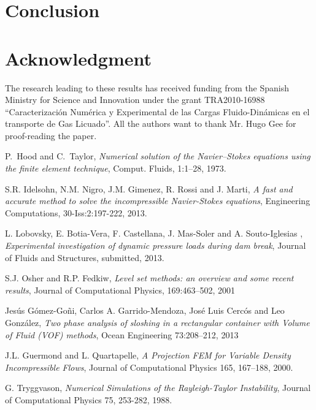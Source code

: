 \documentclass[a4paper,conference]{IEEEtran}
\begin{document}
\section{Conclusion}



\section*{Acknowledgment}
The research  leading  to these results has received funding from the Spanish Ministry for Science and
 Innovation under the grant TRA2010-16988
``Caracterizaci\'on Num\'erica y Experimental de las Cargas Fluido-Din\'amicas en el transporte de Gas Licuado''.
All the authors want to thank Mr. Hugo Gee for proof-reading the paper.

\begin{thebibliography}{99}

P.~Hood and C.~Taylor, \emph{Numerical solution of the Navier–Stokes equations using the finite
element technique}, Comput. Fluids, 1:1–28, 1973.

S.R. Idelsohn, N.M. Nigro, J.M. Gimenez, R. Rossi and J. Marti, \emph{A fast and accurate method to solve the incompressible Navier-Stokes equations}, Engineering Computations, 30-Iss:2:197-222, 2013.

L. Lobovsky, E. Botia-Vera, F. Castellana, J. Mas-Soler and A. Souto-Iglesias , \emph{Experimental investigation of dynamic pressure loads during dam break}, Journal of Fluids and Structures, submitted, 2013.


S.J. Osher and R.P. Fedkiw, \emph{Level set methods: an overview and some recent results}, Journal of Computational Physics, 169:463–502, 2001

Jes\'us G\'omez-Go\~ni, Carlos A. Garrido-Mendoza, Jos\'e Luis Cerc\'os and Leo Gonz\'alez, \emph{Two phase analysis of sloshing in a rectangular container with Volume of Fluid (VOF) methods}, Ocean Engineering 73:208–212, 2013

J.L. Guermond and L. Quartapelle, \emph{A Projection FEM for Variable Density Incompressible Flows}, Journal of Computational Physics 165, 167–188, 2000.

G. Tryggvason, \emph{Numerical Simulations of the Rayleigh-Taylor Instability}, Journal of Computational Physics 75, 253-282, 1988.

\end{thebibliography}


\end{document}

